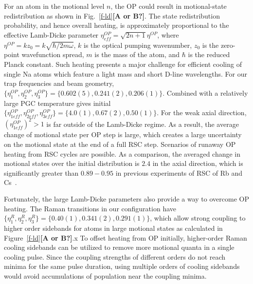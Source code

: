 \documentclass[aps,prl,twocolumn,groupedaddress]{revtex4-1}
\newcommand{\eff}{ef\! f}
\newcommand{\fxnote}[1]{{\textbf{[#1]}}}
\begin{document}
For an atom in the motional level $n$, the OP could result in motional-state redistribution
as shown in Fig.~\ref{f-ld}\fxnote{A or B?}. The state redistribution probability,
and hence overall heating, is approximately proportional to the effective Lamb-Dicke parameter
$\eta^{OP}_{\eff}=\sqrt{2n+1}\eta^{OP}$, where $\eta^{OP}=k z_0=k \sqrt{\hbar/2m\omega}$,
$k$ is the optical pumping wavenumber, $z_0$ is the zero-point wavefunction spread,
$m$ is the mass of the atom, and $\hbar$ is the reduced Planck constant.
Such heating presents a major challenge for efficient cooling of single Na atoms
which feature a light mass and short D-line wavelengths.
For our trap frequencies and beam geometry,
$\{\eta^{OP}_1,\eta^{OP}_2,\eta^{OP}_3\} = \{0.602(5), 0.241(2), 0.206(1)\}$.
Combined with a relatively large PGC temperature gives initial
$\{\eta^{OP}_{1\eff},\eta^{OP}_{2\eff},\eta^{OP}_{3\eff}\} = \{4.0(1), 0.67(2), 0.50(1)\}$.
For the weak axial direction, $(\eta^{OP}_{1\eff})^2>1$ is far outside of the Lamb-Dicke regime.
As a result, the average change of motional state per OP step is large,
which creates a large uncertainty on the motional state at the end of a full RSC step.
Scenarios of runaway OP heating from RSC cycles are possible.
As a comparison, the averaged change in motional states over the initial distribution
is $2.4$ in the axial direction, which is significantly greater than $0.89-0.95$
in previous experiments of RSC of Rb and Cs~\cite{Li2012,Kaufman2012,Thompson2013,Liu2017}.

Fortunately, the large Lamb-Dicke parameters also provide a way to overcome OP heating.
The Raman transitions in our configuration have
$\{\eta^R_{1},\eta^R_{2},\eta^R_{3}\} = \{0.40(1), 0.341(2), 0.291(1)\}$,
which allow strong coupling to higher order sidebands for atoms in large motional states
as calculated in Figure~\ref{f-ld}\fxnote{A or B?}.x
To offset heating from OP initially, higher-order Raman cooling sidebands can be utilized
to remove more motional quanta in a single cooling pulse.
Since the coupling strengths of different orders do not reach minima for the same pulse duration,
using multiple orders of cooling sidebands would avoid accumulations of population
near the coupling minima.
\end{document}
